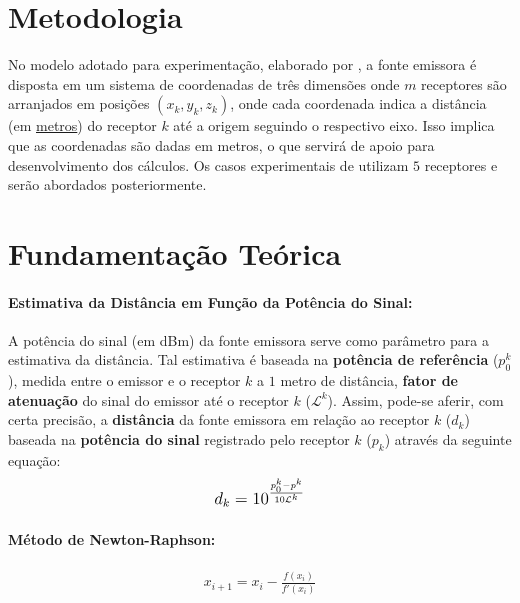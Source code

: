 	\section{Metodologia}
	\label{sec:metodologia}
	No modelo adotado para experimentação, elaborado por \cite{polidorio:triangulacao}, a fonte emissora é disposta
	em um sistema de coordenadas de três dimensões onde $m$ receptores são arranjados em posições $(x_k, y_k, z_k)$, onde
	cada coordenada indica a distância (em \underline{metros}) do receptor $k$ até a origem seguindo o respectivo eixo. Isso implica que as coordenadas
	são dadas em metros, o que servirá de apoio para desenvolvimento dos cálculos.
	Os casos experimentais de \cite{polidorio:triangulacao} utilizam $5$ receptores e serão abordados posteriormente.

	\section{Fundamentação Teórica}
	\label{sec:fund_teor}

	\paragraph{Estimativa da Distância em Função da Potência do Sinal:}
	A potência do sinal (em dBm) da fonte emissora serve como parâmetro para a estimativa da distância.
	Tal estimativa é baseada na \textbf{potência de referência} ($p^k_0$), medida entre o emissor e o receptor $k$ a $1$ metro de distância,
	\textbf{fator de atenuação} do sinal do emissor até o receptor $k$ ($\mathcal{L}^k$). Assim, pode-se aferir, com certa precisão, a \textbf{distância} da fonte emissora em relação ao receptor $k$
	($d_k$) baseada na \textbf{potência do sinal} registrado pelo receptor $k$ ($p_k$) através da seguinte equação:
	\begin{align}
		\mathlarger{d_k = 10^{\frac{p^k_0 - p^k}{10\mathcal{L}^k}}} \label{eq:distancia}
	\end{align}

	\paragraph{Método de Newton-Raphson:}
	\begin{align}
			x_{i+1} = x_i - \frac{f(x_i)}{f'(x_i)} \label{eq:nr}
	\end{align}

